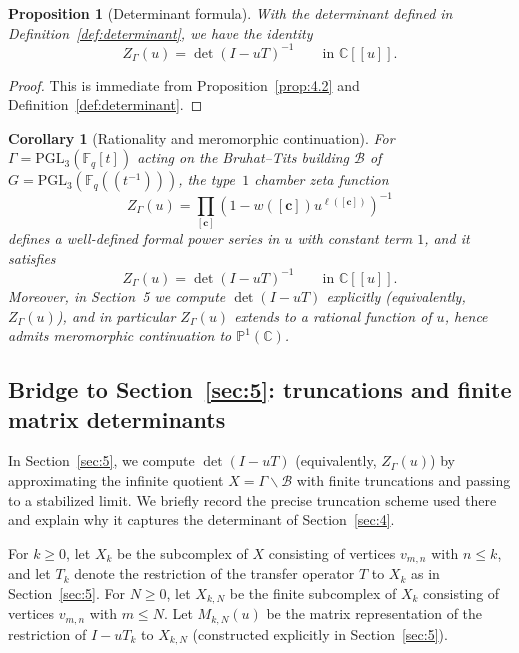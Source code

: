 \documentclass[11pt]{amsart}
\newtheorem{coro}[thm]{Corollary}
\newtheorem{prop}[thm]{Proposition}
\theoremstyle{definition}
\theoremstyle{remark}
\numberwithin{equation}{section}
\begin{document}
\begin{prop}[Determinant formula]\label{prop:det-formula}
With the determinant defined in Definition~\ref{def:determinant}, we have the identity
\[
Z_{\Gamma}(u)=\det(I-uT)^{-1}
\qquad\text{in }\mathbb{C}[\![u]\!].
\]
\end{prop}

\begin{proof}
This is immediate from Proposition~\ref{prop:4.2} and Definition~\ref{def:determinant}.
\end{proof}

\begin{coro}[Rationality and meromorphic continuation]\label{coro:rationality}
For $\Gamma=\mathrm{PGL}_3(\mathbb{F}_q[t])$ acting on the Bruhat--Tits building $\mathcal{B}$
of $G=\mathrm{PGL}_3(\mathbb{F}_q(\!(t^{-1})\!))$, the type~$1$ chamber zeta function
\[
Z_{\Gamma}(u)=\prod_{[\mathbf{c}]}\left(1-w([\mathbf{c}])u^{\ell([\mathbf{c}])}\right)^{-1}
\]
defines a well-defined formal power series in $u$ with constant term $1$, and it satisfies
\[
Z_{\Gamma}(u)=\det(I-uT)^{-1}
\qquad\text{in }\mathbb{C}[\![u]\!].
\]
Moreover, in Section~5 we compute $\det(I-uT)$ explicitly (equivalently, $Z_\Gamma(u)$),
and in particular $Z_{\Gamma}(u)$ extends to a rational function of $u$, hence admits
meromorphic continuation to $\mathbb{P}^1(\mathbb{C})$.
\end{coro}

\subsection{Bridge to Section~\ref{sec:5}: truncations and finite matrix determinants}\label{subsec:bridge_45}

In Section~\ref{sec:5}, we compute $\det(I-uT)$ (equivalently, $Z_\Gamma(u)$) by approximating the
infinite quotient $X=\Gamma\backslash\mathcal{B}$ with finite truncations and passing to a stabilized limit.
We briefly record the precise truncation scheme used there and explain why it captures the determinant of Section~\ref{sec:4}.

For $k\ge 0$, let $X_k$ be the subcomplex of $X$ consisting of vertices $v_{m,n}$ with $n\le k$,
and let $T_k$ denote the restriction of the transfer operator $T$ to $X_k$ as in Section~\ref{sec:5}.
For $N\ge 0$, let $X_{k,N}$ be the finite subcomplex of $X_k$ consisting of vertices $v_{m,n}$ with $m\le N$.
Let $M_{k,N}(u)$ be the matrix representation of the restriction of $I-uT_k$ to $X_{k,N}$
(constructed explicitly in Section~\ref{sec:5}).
\end{document}
